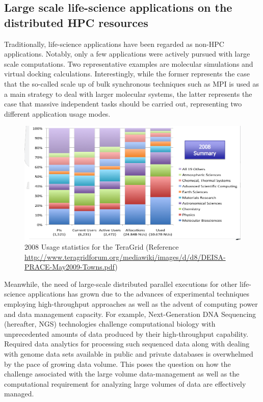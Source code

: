 \documentclass{sig-alternate}
\begin{document}
\subsection{Large scale life-science applications on the distributed HPC resources}
Traditionally, life-science applications have been regarded as non-HPC
applications.  Notably, only a few applications were actively pursued with
large scale computations.  Two representative examples are molecular
simulations and virtual docking calculations.  Interestingly, while
the former represents the case that the so-called scale up of bulk
synchronous techniques such as MPI is used as a main strategy to deal with
larger molecular systems, the latter represents the case that massive
independent tasks should be carried out, representing two different
application usage modes.

\begin{figure}
 \centering
\includegraphics[scale=0.27]{figures/teragrid-discipline08}
\caption{\small 2008 Usage statistics for the TeraGrid (Reference
  \url{http://www.teragridforum.org/mediawiki/images/d/d8/DEISA-PRACE-May2009-Towns.pdf})}
  \label{tg2008}
\end{figure}

Meanwhile, the need of large-scale distributed parallel executions for
other life-science applications has grown due to the advances of
experimental techniques employing high-throughput approaches as well as
the advent of computing power and data management capacity.  For
example, Next-Generation DNA Sequencing (hereafter, NGS) technologies
challenge computational biology with unprecedented amounts of data
produced by their high-throughput capability.  Required data analytics
for processing such sequenced data along with dealing with genome data
sets available in public and private databases is overwhelmed by the
pace of growing data volume.  This poses the question on how the
challenge associated with the large volume data-management as well as the computational requirement
for analyzing large volumes of data are effectively managed.
\end{document}
